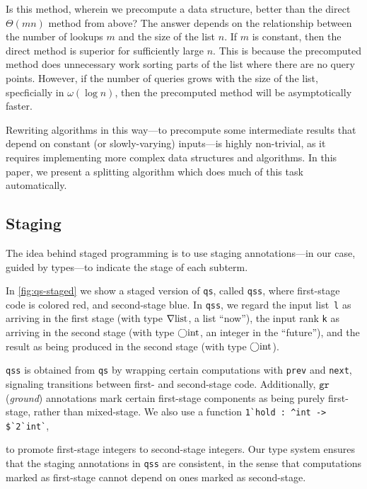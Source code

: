 \begin{abstrsyn}
Is this method, wherein we precompute a data structure, better than the direct $\Theta(mn)$ method from above? 
The answer depends on the relationship between the number of lookups $m$ and the size of the list $n$.
If $m$ is constant, then the direct method is superior for sufficiently large $n$.
This is because the precomputed method does unnecessary work 
sorting parts of the list where there are no query points.
However, if the number of queries grows with the size of the list, 
specficially in $\omega(\log n)$,
then the precomputed method will be asymptotically faster.

Rewriting algorithms in this way---to 
precompute some intermediate results that depend on constant (or slowly-varying) inputs---is 
highly non-trivial,
as it requires implementing more complex data structures and algorithms.  
In this paper, we present a splitting algorithm which does much of this task automatically.

\subsection{Staging}


The idea behind staged programming is to use staging annotations---in our case,
guided by types---to indicate the stage of each subterm. 

In \ref{fig:qs-staged} we show a staged version of \texttt{qs}, called
\texttt{qss}, where first-stage code is colored red, and second-stage blue. In
\texttt{qss}, we regard the input list~\texttt{l} as arriving in the first stage
(with type $\nabla\mathrm{list}$, a list ``now''), the input rank \texttt{k} as
arriving in the second stage (with type $\bigcirc{\rm int}$, an integer in the
``future''), and the result as being produced in the second stage (with type
$\bigcirc{\rm int}$).

\texttt{qss} is obtained from \texttt{qs} by wrapping certain computations with
\texttt{prev} and \texttt{next}, signaling transitions between first- and
second-stage code. Additionally, $\texttt{gr}$ (\emph{ground}) annotations 
mark certain first-stage components as being purely first-stage, rather than mixed-stage.
%
We also use a function 
\lstinline{1`hold : ^int -> $`2`int`}, 
\begin{comment}$ this comment block is here for syntax highlighting reasons\end{comment}
to promote first-stage integers to second-stage integers.
%
Our type system ensures that the staging annotations in \texttt{qss} are
consistent, in the sense that computations marked as first-stage cannot depend
on ones marked as second-stage.


\end{abstrsyn}
